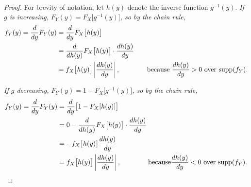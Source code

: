 \begin{proof}
For brevity of notation, let $h(y)$ denote the inverse function $g^{-1}(y)$.
\ben
\it If $g$ is increasing, $F_Y(y) = F_X\big[g^{-1}(y)\big]$, so by the chain rule,
%
%
%
\begin{align*}
f_Y(y)
	= \frac{d}{dy} F_Y(y)
	& = \frac{d}{dy} F_X\big[h(y)\big] \\
	& = \frac{d}{dh(y)} F_X\big[h(y)\big]\cdot \frac{dh(y)}{dy} \\
	& = f_X\big[h(y)\big]\left|\frac{dh(y)}{dy}\right|, \text{\qquad\qquad because } \frac{dh(y)}{dy}>0\text{ over $\text{supp}(f_Y)$.}
\end{align*}

\it If $g$ decreasing, $F_Y(y) = 1 - F_X\big[g^{-1}(y)\big]$, so by the chain rule,
\begin{align*}
f_Y(y)
	= \frac{d}{dy} F_Y(y)
	& = \frac{d}{dy} \big[1 - F_X[h(y)]\big] \\
	& = 0 - \frac{d}{dh(y)} F_X\big[h(y)\big]\cdot \frac{dh(y)}{dy} \\
	& = - f_X\big[h(y)\big] \frac{dh(y)}{dy} \\
	& = f_X\big[h(y)\big]\left|\frac{dh(y)}{dy}\right|, \text{\qquad\qquad because} \frac{dh(y)}{dy}<0\text{ over $\text{supp}(f_Y)$.}
\end{align*}
\een
\end{proof}




